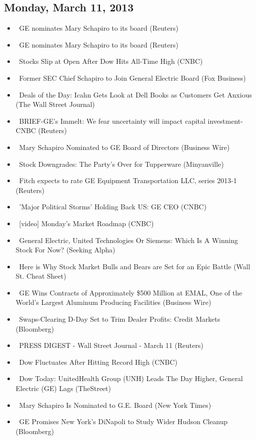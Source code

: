 \documentclass[11pt,asymmetric]{article}
\begin{document}
\subsection*{Monday, March 11, 2013}
\begin{itemize}
\item\ GE nominates Mary Schapiro to its board (Reuters)
\item\ GE nominates Mary Schapiro to its board (Reuters)
\item\ Stocks Slip at Open After Dow Hits All-Time High (CNBC)
\item\ Former SEC Chief Schapiro to Join General Electric Board (Fox Business)
\item\ Deals of the Day: Icahn Gets Look at Dell Books as Customers Get Anxious (The Wall Street Journal)
\item\ BRIEF-GE's Immelt: We fear uncertainty will impact capital investment-CNBC (Reuters)
\item\ Mary Schapiro Nominated to GE Board of Directors (Business Wire)
\item\ Stock Downgrades: The Party's Over for Tupperware (Minyanville)
\item\ Fitch expects to rate GE Equipment Transportation LLC, series 2013-1 (Reuters)
\item\ 'Major Political Storms' Holding Back US: GE CEO (CNBC)
\item\ [video] Monday's Market Roadmap (CNBC)
\item\ General Electric, United Technologies Or Siemens: Which Is A Winning Stock For Now? (Seeking Alpha)
\item\ Here is Why Stock Market Bulls and Bears are Set for an Epic Battle (Wall St. Cheat Sheet)
\item\ GE Wins Contracts of Approximately \$500 Million at EMAL, One of the World’s Largest Aluminum Producing Facilities (Business Wire)
\item\ Swaps-Clearing D-Day Set to Trim Dealer Profits: Credit Markets (Bloomberg)
\item\ PRESS DIGEST - Wall Street Journal - March 11 (Reuters)
\item\ Dow Fluctuates After Hitting Record High (CNBC)
\item\ Dow Today: UnitedHealth Group (UNH) Leads The Day Higher, General Electric (GE) Lags (TheStreet)
\item\ Mary Schapiro Is Nominated to G.E. Board (New York Times)
\item\ GE Promises New York’s DiNapoli to Study Wider Hudson Cleanup (Bloomberg)

\end{itemize}
\end{document}
